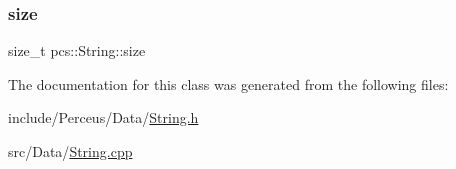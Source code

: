 \subsubsection{\texorpdfstring{size}{size}}
{\footnotesize\ttfamily size\+\_\+t pcs\+::\+String\+::size\hspace{0.3cm}{\ttfamily [private]}}



The documentation for this class was generated from the following files\+:\begin{DoxyCompactItemize}
\item 
include/\+Perceus/\+Data/\hyperlink{String_8h}{String.\+h}\item 
src/\+Data/\hyperlink{String_8cpp}{String.\+cpp}\end{DoxyCompactItemize}
